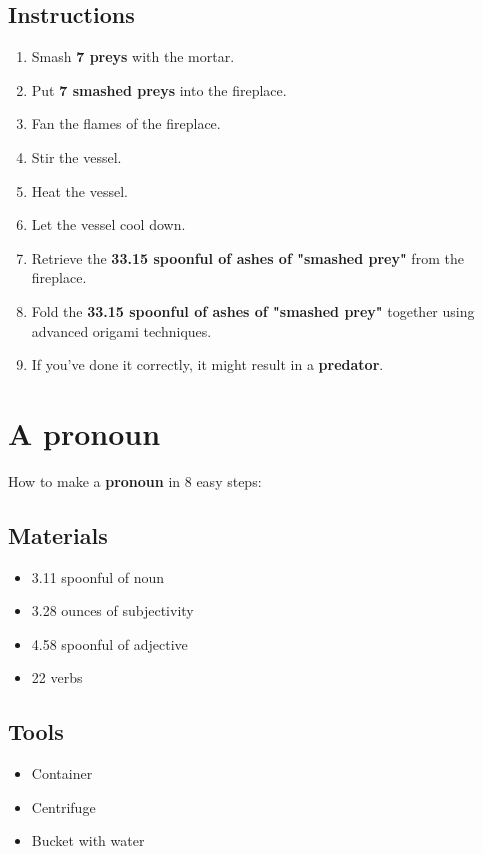 \documentclass{article}
\begin{document}
\subsection{Instructions}\begin{enumerate}
\item 
Smash \textbf{7 preys} with the mortar.
\item 
Put \textbf{7 smashed preys} into the fireplace.
\item 
Fan the flames of the fireplace.
\item 
Stir the vessel.
\item 
Heat the vessel.
\item 
Let the vessel cool down.
\item 
Retrieve the \textbf{33.15 spoonful of ashes of "smashed prey"} from the fireplace.
\item 
Fold the \textbf{33.15 spoonful of ashes of "smashed prey"} together using advanced origami techniques.
\item 
If you've done it correctly, it might result in a \textbf{predator}.
\end{enumerate}
\newpage
\section{A pronoun}How to make a \textbf{pronoun} in 8 easy steps:

\subsection{Materials}\begin{itemize}
\item 
3.11 spoonful of noun
\item 
3.28 ounces of subjectivity
\item 
4.58 spoonful of adjective
\item 
22 verbs
\end{itemize}
\subsection{Tools}\begin{itemize}
\item 
Container
\item 
Centrifuge
\item 
Bucket with water
\end{itemize}
\end{document}
